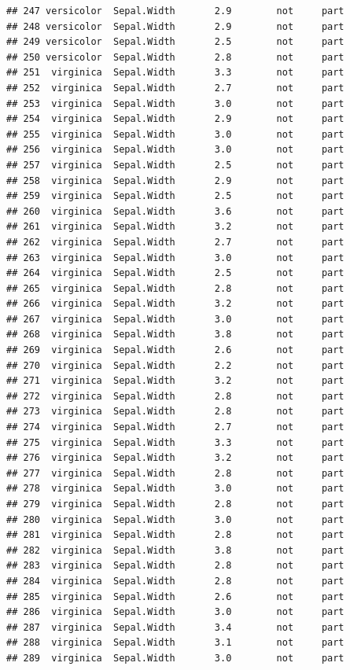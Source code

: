 \documentclass[krantz2]{krantz}\usepackage{knitr}%
\begin{document}
\begin{knitrout}
\begin{kframe}
\begin{verbatim}
## 247 versicolor  Sepal.Width       2.9        not     part
## 248 versicolor  Sepal.Width       2.9        not     part
## 249 versicolor  Sepal.Width       2.5        not     part
## 250 versicolor  Sepal.Width       2.8        not     part
## 251  virginica  Sepal.Width       3.3        not     part
## 252  virginica  Sepal.Width       2.7        not     part
## 253  virginica  Sepal.Width       3.0        not     part
## 254  virginica  Sepal.Width       2.9        not     part
## 255  virginica  Sepal.Width       3.0        not     part
## 256  virginica  Sepal.Width       3.0        not     part
## 257  virginica  Sepal.Width       2.5        not     part
## 258  virginica  Sepal.Width       2.9        not     part
## 259  virginica  Sepal.Width       2.5        not     part
## 260  virginica  Sepal.Width       3.6        not     part
## 261  virginica  Sepal.Width       3.2        not     part
## 262  virginica  Sepal.Width       2.7        not     part
## 263  virginica  Sepal.Width       3.0        not     part
## 264  virginica  Sepal.Width       2.5        not     part
## 265  virginica  Sepal.Width       2.8        not     part
## 266  virginica  Sepal.Width       3.2        not     part
## 267  virginica  Sepal.Width       3.0        not     part
## 268  virginica  Sepal.Width       3.8        not     part
## 269  virginica  Sepal.Width       2.6        not     part
## 270  virginica  Sepal.Width       2.2        not     part
## 271  virginica  Sepal.Width       3.2        not     part
## 272  virginica  Sepal.Width       2.8        not     part
## 273  virginica  Sepal.Width       2.8        not     part
## 274  virginica  Sepal.Width       2.7        not     part
## 275  virginica  Sepal.Width       3.3        not     part
## 276  virginica  Sepal.Width       3.2        not     part
## 277  virginica  Sepal.Width       2.8        not     part
## 278  virginica  Sepal.Width       3.0        not     part
## 279  virginica  Sepal.Width       2.8        not     part
## 280  virginica  Sepal.Width       3.0        not     part
## 281  virginica  Sepal.Width       2.8        not     part
## 282  virginica  Sepal.Width       3.8        not     part
## 283  virginica  Sepal.Width       2.8        not     part
## 284  virginica  Sepal.Width       2.8        not     part
## 285  virginica  Sepal.Width       2.6        not     part
## 286  virginica  Sepal.Width       3.0        not     part
## 287  virginica  Sepal.Width       3.4        not     part
## 288  virginica  Sepal.Width       3.1        not     part
## 289  virginica  Sepal.Width       3.0        not     part

\end{verbatim}
\end{kframe}
\end{knitrout}
\end{document}
